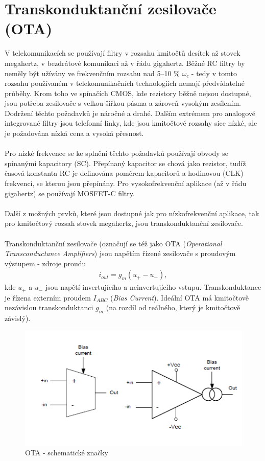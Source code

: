 \documentclass[twoside]{article}
\begin{document}
\section{Transkonduktanční zesilovače (OTA)}
V telekomunikacích se používají filtry v rozsahu kmitočtů desítek až stovek megahertz, v bezdrátové komunikaci až v řádu gigahertz. Běžné RC filtry by neměly být užívány ve frekvenčním rozsahu nad 5--10 $\%$ $\omega _c$ - tedy v tomto rozsahu používaném v telekomunikačních technologiích nemají předvídatelné průběhy. Krom toho ve spínačích CMOS, kde rezistory běžně nejsou dostupné, jsou potřeba zesilovače s velkou šířkou pásma a zároveň vysokým zesílením. Dodržení těchto požadavků je náročné a drahé. Dalším extrémem pro analogové integrované filtry jsou telefonní linky, kde jsou kmitočtové rozsahy sice nízké, ale je požadována nízká cena a vysoká přesnost.\\
\\
Pro nízké frekvence se ke splnění těchto požadavků používají obvody se spínanými kapacitory (SC). Přepínaný kapacitor se chová jako rezistor, tudíž časová konstanta RC je definována poměrem kapacitorů a hodinovou (CLK) frekvencí, se kterou jsou přepínány. Pro vysokofrekvenční aplikace (až v řádu gigahertz) se používají MOSFET-C filtry.\\
\\
Další z možných prvků, které jsou dostupné jak pro nízkofrekvenční aplikace, tak pro kmitočtový rozsah stovek megahertz, jsou transkonduktanční zesilovače.\\\\
Transkonduktanční zesilovače (označují se též jako OTA (\textit{Operational Transconductance Amplifiers}) jsou napětím řízené zesilovače s proudovým výstupem - zdroje proudu
\begin{align}
i_{out} = g_m(u_+ - u_-),
\end{align}
kde $u_+$ a $u_-$ jsou napětí invertujícího a neinvertujícího vstupu.  Transkonduktance je řízena externím proudem $I_{ABC}$ (\textit{Bias Current}). Ideální OTA má kmitočtově nezávislou transkonduktanci $g_m$ (na rozdíl od reálného, který je kmitočtově závislý).
\begin{figure}[H]
\centering
\includegraphics[scale=0.7]{image7.png}
\caption{OTA - schematické značky \cite{3}}
\end{figure}
\end{document}
